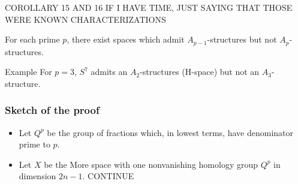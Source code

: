 \documentclass{beamer}
\theoremstyle{definition}
\begin{document}
\begin{frame}
COROLLARY 15 AND 16 IF I HAVE TIME, JUST SAYING THAT THOSE WERE KNOWN CHARACTERIZATIONS
\end{frame}

\begin{frame}[fragile]
\begin{theorem}
For each prime $p$, there exist spaces which admit $A_{p-1}$-structures but not $A_p$-structures.
\end{theorem}\pause
\begin{block}{Example}
For $p=3$, $S^7$ admits an $A_2$-structures (H-space) but not an $A_3$-structure.
\end{block}
\end{frame}
\begin{frame}
\frametitle{Sketch of the proof}
\begin{itemize}
\item<1-> Let $Q^p$ be the group of fractions which, in lowest terms, have denominator prime to $p$.
\item<2-> Let $X$ be the More space with one nonvanishing homology group $Q^p$ in dimension $2n-1$. %
CONTINUE
\end{itemize}
\end{frame}
\end{document}
